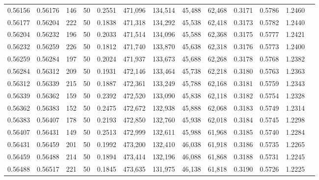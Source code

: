 \begin{tabular}{rrrrrrrrrrrrr}
0.56156 & 0.56176 &   146 &  50 &                                     0.2551 & 471,096 & 134,514 &  45,488 &  62,468 & 0.3171 & 0.5786 & 1.2460 \\
0.56177 & 0.56204 &   222 &  50 &                                     0.1838 & 471,318 & 134,292 &  45,538 &  62,418 & 0.3173 & 0.5782 & 1.2440 \\
0.56204 & 0.56232 &   196 &  50 &                                     0.2033 & 471,514 & 134,096 &  45,588 &  62,368 & 0.3175 & 0.5777 & 1.2421 \\
0.56232 & 0.56259 &   226 &  50 &                                     0.1812 & 471,740 & 133,870 &  45,638 &  62,318 & 0.3176 & 0.5773 & 1.2400 \\
0.56259 & 0.56284 &   197 &  50 &                                     0.2024 & 471,937 & 133,673 &  45,688 &  62,268 & 0.3178 & 0.5768 & 1.2382 \\
0.56284 & 0.56312 &   209 &  50 &                                     0.1931 & 472,146 & 133,464 &  45,738 &  62,218 & 0.3180 & 0.5763 & 1.2363 \\
0.56312 & 0.56339 &   215 &  50 &                                     0.1887 & 472,361 & 133,249 &  45,788 &  62,168 & 0.3181 & 0.5759 & 1.2343 \\
0.56339 & 0.56362 &   159 &  50 &                                     0.2392 & 472,520 & 133,090 &  45,838 &  62,118 & 0.3182 & 0.5754 & 1.2328 \\
0.56362 & 0.56383 &   152 &  50 &                                     0.2475 & 472,672 & 132,938 &  45,888 &  62,068 & 0.3183 & 0.5749 & 1.2314 \\
0.56383 & 0.56407 &   178 &  50 &                                     0.2193 & 472,850 & 132,760 &  45,938 &  62,018 & 0.3184 & 0.5745 & 1.2298 \\
0.56407 & 0.56431 &   149 &  50 &                                     0.2513 & 472,999 & 132,611 &  45,988 &  61,968 & 0.3185 & 0.5740 & 1.2284 \\
0.56431 & 0.56459 &   201 &  50 &                                     0.1992 & 473,200 & 132,410 &  46,038 &  61,918 & 0.3186 & 0.5735 & 1.2265 \\
0.56459 & 0.56488 &   214 &  50 &                                     0.1894 & 473,414 & 132,196 &  46,088 &  61,868 & 0.3188 & 0.5731 & 1.2245 \\
0.56488 & 0.56517 &   221 &  50 &                                     0.1845 & 473,635 & 131,975 &  46,138 &  61,818 & 0.3190 & 0.5726 & 1.2225 \\

\end{tabular}
